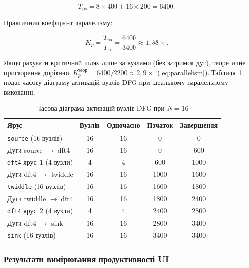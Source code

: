 \begin{equation}
  T_{\mathrm{ps}} = 8 \times 400 + 16 \times 200 = 6400.
  \label{eq:seq_full}
\end{equation}

Практичний коефіцієнт паралелізму:

\begin{equation}
  K_p = \frac{T_{\mathrm{ps}}}{T_{\mathrm{kr}}} = \frac{6400}{3400} \approx 1{,}88\times.
  \label{eq:parallelism_full}
\end{equation}

Якщо рахувати критичний шлях лише за вузлами (без затримок дуг),
теоретичне прискорення дорівнює $K_p^{\text{теор}} = 6400/2200 \approx 2{,}9\times$~(\ref{eq:parallelism}).
Таблиця~\ref{tab:timeline} подає часову діаграму активацій вузлів DFG
при ідеальному паралельному виконанні.

\begin{table}[H]
  \caption{Часова діаграма активацій вузлів DFG при $N=16$}
  \label{tab:timeline}
  \centering
  \begin{tabular}{lcccc}
    \toprule
    Ярус & Вузлів & Одночасно & Початок & Завершення \\
    \midrule
    \texttt{source} (16 вузлів)      & 16 & 16 &    0 &    0 \\
    Дуги source $\to$ dft4           & 16 & 16 &    0 &  600 \\
    \texttt{dft4} ярус~1 (4 вузли)   &  4 &  4 &  600 & 1000 \\
    Дуги dft4 $\to$ twiddle          & 16 & 16 & 1000 & 1600 \\
    \texttt{twiddle} (16 вузлів)     & 16 & 16 & 1600 & 1800 \\
    Дуги twiddle $\to$ dft4          & 16 & 16 & 1800 & 2400 \\
    \texttt{dft4} ярус~2 (4 вузли)   &  4 &  4 & 2400 & 2800 \\
    Дуги dft4 $\to$ sink             & 16 & 16 & 2800 & 3400 \\
    \texttt{sink} (16 вузлів)        & 16 & 16 & 3400 & 3400 \\
    \bottomrule
  \end{tabular}
\end{table}

\subsubsection*{Результати вимірювання продуктивності UI}

